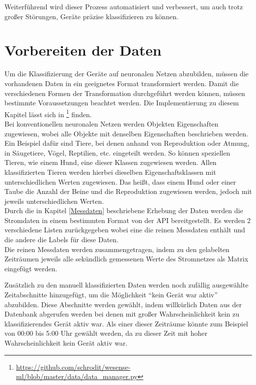     Weiterführend wird dieser Prozess automatisiert und verbessert, um auch trotz großer Störungen, Geräte präzise klassifizieren zu können. 

\section{Vorbereiten der Daten}\label{VorbereitenDerDaten}
    Um die Klassifizierung der Geräte auf neuronalen Netzen abzubilden, müssen die vorhandenen Daten in ein geeignetes Format transformiert werden.
    Damit die verschiedenen Formen der Transformation durchgeführt werden können, müssen bestimmte Voraussetzungen beachtet werden.
    Die Implementierung zu diesem Kapitel lässt sich in \footnote{\url{https://github.com/schrodit/wesense-ml/blob/master/data/data_manager.py}} finden.\\
    
    \noindent
    Bei konventionellen neuronalen Netzen werden Objekten Eigenschaften zugewiesen, wobei alle Objekte mit denselben Eigenschaften beschrieben werden.
    Ein Beispiel dafür sind Tiere, bei denen anhand von Reproduktion oder Atmung, in Säugetiere, Vögel, Reptilien, etc. eingeteilt werden. 
    So können speziellen Tieren, wie einem Hund, eine dieser Klassen zugewiesen werden.
    Allen klassifizierten Tieren werden hierbei dieselben Eigenschaftsklassen mit unterschiedlichen Werten zugewiesen.
    Das heißt, dass einem Hund oder einer Taube die Anzahl der Beine und die Reproduktion zugewiesen werden, jedoch mit jeweils unterschiedlichen Werten.\\
    
    Durch die in Kapitel \ref{Messdaten} beschriebene Erhebung der Daten werden die Stromdaten in einem bestimmten Format von der API bereitgestellt.
    Es werden 2 verschiedene Listen zurückgegeben wobei eine die reinen Messdaten enthält und die andere die Labels für diese Daten.\\
    Die reinen Messdaten werden zusammengetragen, indem zu den gelabelten Zeiträumen jeweils alle sekündlich gemessenen Werte des Stromnetzes als Matrix eingefügt werden.
    \newline

    \noindent
    Zusätzlich zu den manuell klassifizierten Daten werden noch zufällig ausgewählte Zeitabschnitte hinzugefügt, um die Möglichkeit "`kein Gerät war aktiv"' abzubilden.
    Diese Abschnitte werden gewählt, indem willkürlich Daten aus der Datenbank abgerufen werden bei denen mit großer Wahrscheinlichkeit kein zu klassifizierendes Gerät aktiv war.
    Als einer dieser Zeiträume könnte zum Beispiel von 00:00 bis 5:00 Uhr gewählt werden, da zu dieser Zeit mit hoher Wahrscheinlichkeit kein Gerät aktiv war.
    \newline

